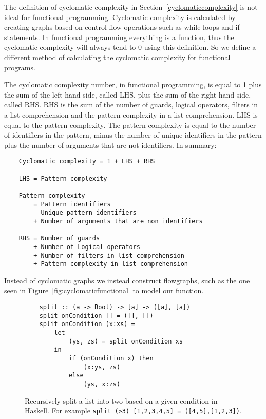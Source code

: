 The definition of cyclomatic complexity in Section~\ref{cyclomaticcomplexity} is
not ideal for functional programming. Cyclomatic complexity is calculated by
creating graphs based on control flow operations such as while loops and if
statements. In functional programming everything is a function, thus the
cyclomatic complexity will always tend to 0 using this definition. So we define
a different method of calculating the cyclomatic complexity for functional
programs. 

\theoremstyle{definition} 
    \begin{definition} 
    The cyclomatic complexity number, in functional programming, is equal to
    1 plus the sum of the left hand side, called LHS, plus the sum of the
    right hand side, called RHS. RHS is the sum of the number of guards,
    logical operators, filters in a list comprehension and the pattern
    complexity in a list comprehension. LHS is equal to the pattern
    complexity.  The pattern complexity is equal to the number of
    identifiers in the pattern, minus the number of unique identifiers in
    the pattern plus the number of arguments that are not identifiers. In
    summary:

    \begin{lstlisting}
    Cyclomatic complexity = 1 + LHS + RHS

    LHS = Pattern complexity 

    Pattern complexity   
        = Pattern identifiers 
        - Unique pattern identifiers 
        + Number of arguments that are non identifiers

    RHS = Number of guards 
        + Number of Logical operators 
        + Number of filters in list comprehension 
        + Pattern complexity in list comprehension
    \end{lstlisting}
\end{definition}

Instead of cyclomatic graphs we instead construct flowgraphs, such as the one
seen in Figure~\ref{fig:cyclomaticfunctional} to model our function.

\begin{figure}[H]
    \begin{lstlisting}
    split :: (a -> Bool) -> [a] -> ([a], [a])
    split onCondition [] = ([], [])
    split onCondition (x:xs) =
        let 
            (ys, zs) = split onCondition xs
        in 
            if (onCondition x) then 
                (x:ys, zs)
            else 
                (ys, x:zs)
    \end{lstlisting}
    \label{split}
    \caption{Recursively split a list into two based on a given condition in
    Haskell. For example \texttt{split (>3) [1,2,3,4,5] =
    ([4,5],[1,2,3])}.}
\end{figure}

